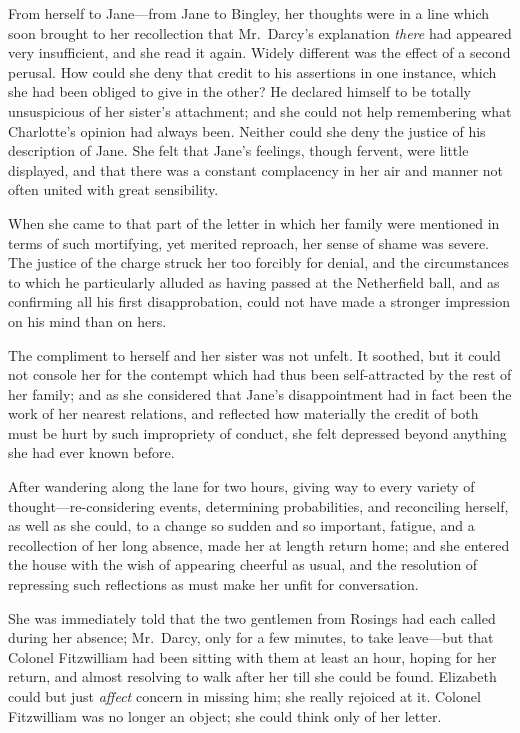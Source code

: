 \documentclass[12pt,english]{book}
\begin{document}
From herself to Jane\mbox{---}from Jane to Bingley, her thoughts
were in a line which soon brought to her recollection that Mr.\ Darcy's
explanation \textit{there} had appeared very insufficient, and she
read it again. Widely different was the effect of a second perusal.
How could she deny that credit to his assertions in one instance,
which she had been obliged to give in the other? He declared himself
to be totally unsuspicious of her sister's attachment; and she could
not help remembering what Charlotte's opinion had always been. Neither
could she deny the justice of his description of Jane. She felt that
Jane's feelings, though fervent, were little displayed, and that there
was a constant complacency in her air and manner not often united
with great sensibility.

When she came to that part of the letter in which her family were
mentioned in terms of such mortifying, yet merited reproach, her sense
of shame was severe. The justice of the charge struck her too forcibly
for denial, and the circumstances to which he particularly alluded
as having passed at the Netherfield ball, and as confirming all his
first disapprobation, could not have made a stronger impression on
his mind than on hers.

The compliment to herself and her sister was not unfelt. It soothed,
but it could not console her for the contempt which had thus been
self-attracted by the rest of her family; and as she considered that
Jane's disappointment had in fact been the work of her nearest relations,
and reflected how materially the credit of both must be hurt by such
impropriety of conduct, she felt depressed beyond anything she had
ever known before.

After wandering along the lane for two hours, giving way to every
variety of thought\mbox{---}re-considering events, determining probabilities,
and reconciling herself, as well as she could, to a change so sudden
and so important, fatigue, and a recollection of her long absence,
made her at length return home; and she entered the house with the
wish of appearing cheerful as usual, and the resolution of repressing
such reflections as must make her unfit for conversation.

She was immediately told that the two gentlemen from Rosings had each
called during her absence; Mr.\ Darcy, only for a few minutes, to
take leave\mbox{---}but that Colonel Fitzwilliam had been sitting
with them at least an hour, hoping for her return, and almost resolving
to walk after her till she could be found. Elizabeth could but just
\textit{affect} concern in missing him; she really rejoiced at it.
Colonel Fitzwilliam was no longer an object; she could think only
of her letter.
\end{document}
